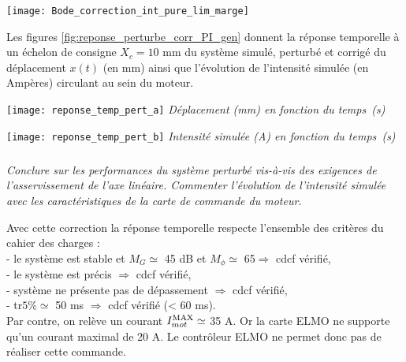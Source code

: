 \begin{multicols}{2}
\begin{corrige}
 
\begin{center}
       \texttt{[image: Bode\_correction\_int\_pure\_lim\_marge]}

 \end{center} 

\end{corrige}
\fi

\ifprof
\else
\vspace{1em}
Les figures \ref{fig:reponse_perturbe_corr_PI_gen} donnent la réponse temporelle à un échelon de consigne $X_c = 10$ mm du système simulé, perturbé et corrigé du déplacement $x(t)$ (en mm)  ainsi que l'évolution de l'intensité simulée (en Ampères) circulant au sein du moteur.

\begin{center}
\texttt{[image: reponse\_temp\_pert\_a]}
\textit{Déplacement (mm) en fonction du temps~(s)}

\texttt{[image: reponse\_temp\_pert\_b]}
\textit{Intensité simulée (A) en fonction du temps~(s)}

\end{center}

\fi


\subparagraph{}\textit{Conclure sur les performances du système perturbé vis-à-vis des exigences de l'asservissement de l'axe linéaire. Commenter l'évolution de l'intensité simulée avec les caractéristiques de la carte de commande du moteur.}


\ifprof
\begin{corrige}
Avec cette correction la réponse temporelle respecte l'ensemble des critères du cahier des charges :\\
- le système est stable et $M_G \simeq$ 45 dB et $M_{\phi} \simeq$ 65\degre $ \Rightarrow $ cdcf vérifié,\\
- le système est précis $ \Rightarrow $ cdcf vérifié,\\
- système ne présente pas de dépassement $ \Rightarrow $ cdcf vérifié,\\
- tr$5\% \simeq$ 50 ms $ \Rightarrow $ cdcf vérifié (< 60 ms).\\
Par contre, on relève un courant $I_{mot}^{\text{\text{MAX}}} \simeq$ 35 A. Or la carte ELMO ne supporte qu'un courant maximal de 20 A. Le contrôleur ELMO ne permet donc pas de réaliser cette commande. 



\end{corrige}
\end{multicols}
